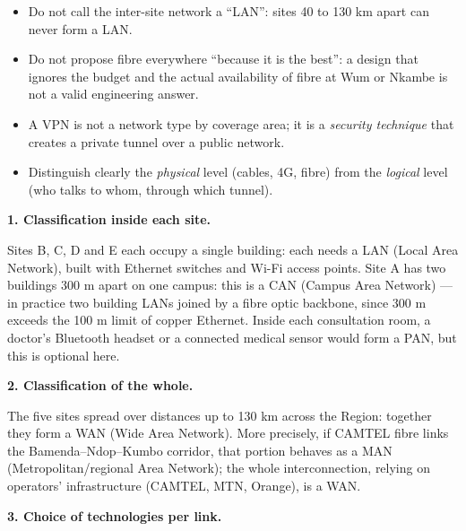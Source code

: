 \documentclass[11pt]{article}
\newcommand{\cle}[1]{{\popxbold\color{popdark}#1}}
\newcounter{popsec}
\newcounter{popsub}
\newcommand{\courssub}[1]{%
  \stepcounter{popsub}%
  \par\vspace{9pt}\noindent{\popxbold\fontsize{11.5}{13}\selectfont\color{popink}{\color{poporange}\thepopsec.\thepopsub}\hspace{6pt}#1}\par\nopagebreak\vspace{4pt}
}
\begin{document}
\begin{attention}
\begin{itemize}
\item Do not call the inter-site network a ``LAN'': sites 40 to 130 km apart can never form a LAN.
\item Do not propose fibre everywhere ``because it is the best'': a design that ignores the budget and the actual availability of fibre at Wum or Nkambe is not a valid engineering answer.
\item A VPN is not a network type by coverage area; it is a \emph{security technique} that creates a private tunnel over a public network.
\item Distinguish clearly the \emph{physical} level (cables, 4G, fibre) from the \emph{logical} level (who talks to whom, through which tunnel).
\end{itemize}
\end{attention}

\courssub{Model answer}

\textbf{1. Classification inside each site.}

Sites B, C, D and E each occupy a single building: each needs a \cle{LAN} (Local Area Network), built with Ethernet switches and Wi-Fi access points. Site A has two buildings 300 m apart on one campus: this is a \cle{CAN} (Campus Area Network) — in practice two building LANs joined by a fibre optic backbone, since 300 m exceeds the 100 m limit of copper Ethernet. Inside each consultation room, a doctor's Bluetooth headset or a connected medical sensor would form a \cle{PAN}, but this is optional here.

\textbf{2. Classification of the whole.}

The five sites spread over distances up to 130 km across the Region: together they form a \cle{WAN} (Wide Area Network). More precisely, if CAMTEL fibre links the Bamenda–Ndop–Kumbo corridor, that portion behaves as a \cle{MAN} (Metropolitan/regional Area Network); the whole interconnection, relying on operators' infrastructure (CAMTEL, MTN, Orange), is a WAN.

\textbf{3. Choice of technologies per link.}
\end{document}
